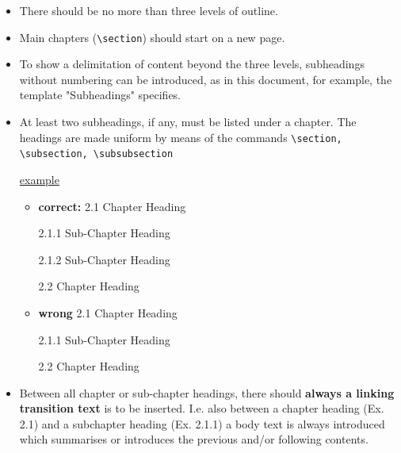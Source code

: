 \begin{itemize}
    \item There should be no more than three levels of outline.
    \item Main chapters (\verb!\section!) should start on a new page.
    \item To show a delimitation of content beyond the three levels, subheadings without numbering can be introduced, as in this document, for example, the template "Subheadings" specifies. 
    \item At least two subheadings, if any, must be listed under a chapter. 
    The headings are made uniform by means of the commands \verb!\section, \subsection, \subsubsection!


\uline{example}
\begin{itemize}
    \item \textbf{correct:} 2.1 Chapter Heading
    
    \hspace{20mm} 2.1.1 Sub-Chapter Heading
    
     \hspace{20mm} 2.1.2 Sub-Chapter Heading
     
     \hspace{14mm} 2.2 Chapter Heading
    \item \textbf{wrong} 2.1 Chapter Heading
    
    \hspace{20mm} 2.1.1 Sub-Chapter Heading
    
    \hspace{14mm} 2.2 Chapter Heading
\end{itemize}

\item Between all chapter or sub-chapter headings, there should \textbf{always a linking transition text} is to be inserted. I.e. also between a chapter heading (Ex. 2.1) and a subchapter heading (Ex. 2.1.1) a body text is always introduced which summarises or introduces the previous and/or following contents.
\end{itemize}

